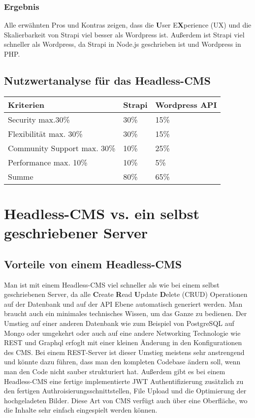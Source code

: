\subsubsection{Ergebnis}
Alle erwähnten Pros und Kontras zeigen, dass  die \textbf{U}ser E\textbf{X}perience (UX)
und die Skalierbarkeit von Strapi viel besser als Wordpress ist.
Außerdem ist Strapi viel schneller als Wordpress,
da Strapi in Node.js geschrieben ist und Wordpress in PHP.
\cite{strapi-vs-wordpress}

\subsection{Nutzwertanalyse für das Headless-CMS}

\begin{tabular}{ |p{3cm}|p{3cm}|p{3cm}| }
    \hline
    Kriterien                   & Strapi & Wordpress API \\
    \hline
    Security max.30\%           & 30\%   & 15\%          \\
    \hline
    Flexibilität max. 30\%      & 30\%   & 15\%          \\
    \hline
    Community Support max. 30\% & 10\%   & 25\%          \\
    \hline
    Performance max. 10\%       & 10\%   & 5\%           \\
    \hline
    Summe                       & 80\%   & 65\%          \\
    \hline
\end{tabular}



\section{Headless-CMS vs. ein selbst geschriebener Server}

\subsection{Vorteile von einem Headless-CMS}
Man ist mit einem Headless-CMS viel schneller als wie bei einem selbst geschriebenen Server,
da alle \textbf{C}reate \textbf{R}ead \textbf{U}pdate \textbf{D}elete (CRUD) Operationen auf der Datenbank und auf der API Ebene automatisch generiert werden. Man braucht auch ein minimales technisches Wissen, um das Ganze zu bedienen.
Der Umstieg auf einer anderen Datenbank wie zum Beispiel von PostgreSQL auf Mongo oder umgekehrt
oder auch auf eine andere Networking Technologie wie REST und Graphql
erfoglt mit einer kleinen Änderung in den Konfigurationen des CMS.
Bei einem REST-Server ist dieser Umstieg meistens sehr anstrengend und könnte dazu führen,
dass man den kompleten Codebase ändern soll, wenn man den Code nicht sauber strukturiert hat.
Außerdem gibt es bei einem Headless-CMS eine fertige implementierte JWT Authentifizierung
zusätzlich zu den fertigen Authroisierungsschnittstellen,
File Upload und die Optimierung der hochgeladeten Bilder.
Diese Art von CMS verfügt auch über eine Oberfläche,
wo die Inhalte sehr einfach eingespielt werden können.

